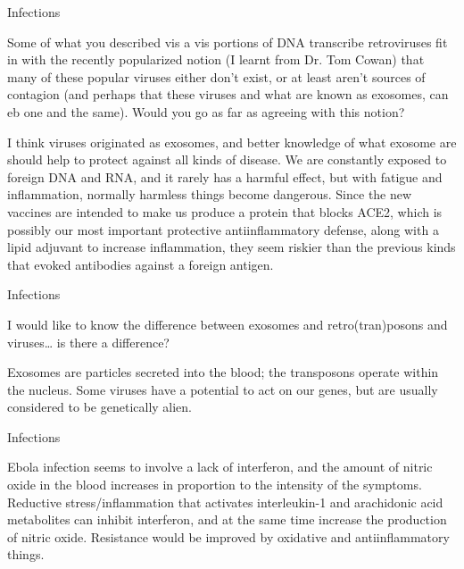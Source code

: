 \documentclass[11pt,oneside,openany,extrafontsizes]{memoir}
\begin{document}
\begin{emailexchange}{Infections}

    \begin{question}
        Some of what you described vis a vis portions of DNA transcribe retroviruses fit in with the recently popularized notion (I learnt from Dr. Tom Cowan) that many of these popular viruses either don't exist, or at least aren't sources of contagion (and perhaps that these viruses and what are known as exosomes, can eb one and the same). Would you go as far as agreeing with this notion?
    \end{question}

    \begin{answer}
        I think viruses originated as exosomes, and better knowledge of what exosome are should help to protect against all kinds of disease. We are constantly exposed to foreign DNA and RNA, and it rarely has a harmful effect, but with fatigue and inflammation, normally harmless things become dangerous. Since the new vaccines are intended to make us produce a protein that blocks ACE2, which is possibly our most important protective antiinflammatory defense, along with a lipid adjuvant to increase inflammation, they seem riskier than the previous kinds that evoked antibodies against a foreign antigen.
    \end{answer}
\end{emailexchange}

\begin{qaexchange}{Infections}

    \begin{question}
        I would like to know the difference between exosomes and retro(tran)posons and viruses\dots{} is there a difference?
    \end{question}

    \begin{answer}
        Exosomes are particles secreted into the blood; the transposons operate within the nucleus. Some viruses have a potential to act on our genes, but are usually considered to be genetically alien.
    \end{answer}
\end{qaexchange}

\begin{standalonequote}{Infections}

    \begin{answer}
        Ebola infection seems to involve a lack of interferon, and the amount of nitric oxide in the blood increases in proportion to the intensity of the symptoms. Reductive stress/inflammation that activates interleukin-1 and arachidonic acid metabolites can inhibit interferon, and at the same time increase the production of nitric oxide. Resistance would be improved by oxidative and antiinflammatory things.
    \end{answer}
\end{standalonequote}
\end{document}
